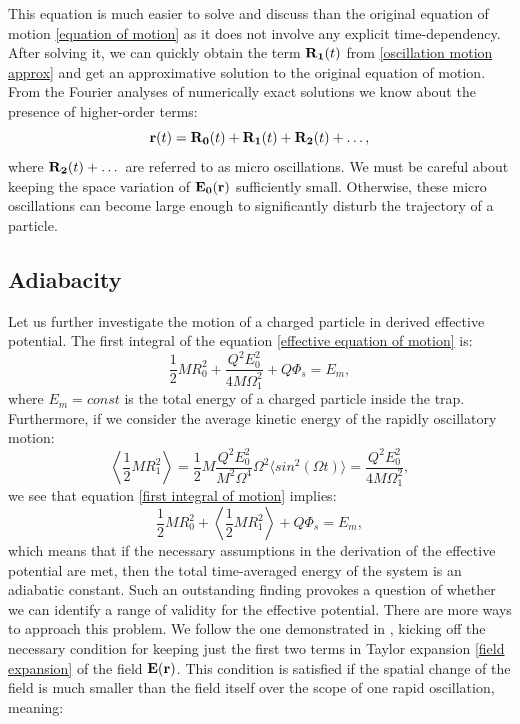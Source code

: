 This equation is much easier to solve and discuss than the original equation of motion \eqref{equation of motion} as it does not involve any explicit time-dependency. After solving it, we can quickly obtain the term $\vb{R_1}(t)$ from \eqref{oscillation motion approx} and get an approximative solution to the original equation of motion. From the Fourier analyses of numerically exact solutions \cite{gerlich1992inhomogeneous} we know about the presence of higher-order terms: $$\vb{r}(t) = \vb{R_0}(t) + \vb{R_1}(t) + \vb{R_2}(t) + \dots,$$ where $\vb{R_2}(t) + \dots$ are referred to as micro oscillations. We must be careful about keeping the space variation of $\vb{E_0}(\vb{r})$ sufficiently small. Otherwise, these micro oscillations can become large enough to significantly disturb the trajectory of a particle.

\subsection{Adiabacity}
Let us further investigate the motion of a charged particle in derived effective potential. The first integral of the equation \eqref{effective equation of motion} is:
\begin{equation}
	\label{first integral of motion}
	\dfrac{1}{2}M R_0^2 + \dfrac{Q^2 E_0^2}{4 M \Omega_1^2} + Q\Phi_s = E_m,
\end{equation}
where $E_m = const$ is the total energy of a charged particle inside the trap. Furthermore, if we consider the average kinetic energy of the rapidly oscillatory motion:
\begin{equation}
	\left\langle \dfrac{1}{2} M R_1^2 \right\rangle = \dfrac{1}{2}M \dfrac{Q^2 E_0^2}{M^2 \Omega^4}\Omega^2 \langle sin^2(\Omega t) \rangle = \dfrac{Q^2 E_0^2}{4 M \Omega_1^2},
\end{equation}
we see that equation \eqref{first integral of motion} implies:
\begin{equation}
	\label{adiabatic constant}
	\dfrac{1}{2}M R_0^2 + \left\langle \dfrac{1}{2} M R_1^2 \right\rangle + Q\Phi_s = E_m,
\end{equation}
which means that if the necessary assumptions in the derivation of the effective potential are met, then the total time-averaged energy of the system is an adiabatic constant. Such an outstanding finding provokes a question of whether we can identify a range of validity for the effective potential. There are more ways to approach this problem. We follow the one demonstrated in \cite{gerlich1992inhomogeneous}, kicking off the necessary condition for keeping just the first two terms in Taylor expansion \eqref{field expansion} of the field $\vb{E}(\vb{r})$. This condition is satisfied if the spatial change of the field is much smaller than the field itself over the scope of one rapid oscillation, meaning:
